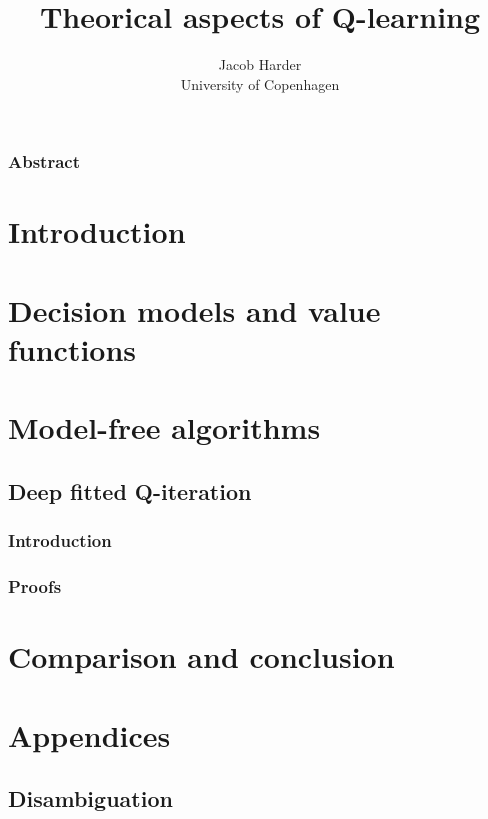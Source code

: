 \documentclass{report}
\title{Theorical aspects of Q-learning}
\author{Jacob Harder \\ University of Copenhagen}
\begin{document}


\subsection*{Abstract}


\newpage
\renewcommand{\baselinestretch}{1.0}\normalsize
\tableofcontents
\renewcommand{\baselinestretch}{1.3}\normalsize

\newpage
\chapter{Introduction}

%
\chapter{Decision models and value functions}


\chapter{Model-free algorithms}


\section{Deep fitted Q-iteration} \label{sec:deepfitted}
\subsection{Introduction}

\subsection{Proofs}


\chapter{Comparison and conclusion}

\setcounter{chapter}{0}%
\renewcommand{\thechapter}{\Alph{chapter}}%
\chapter{Appendices}

\newpage
\section{Disambiguation}

\newpage
{}
\end{document}
